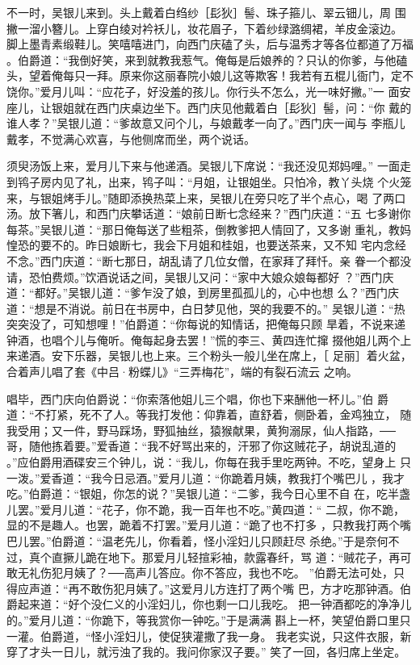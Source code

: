 不一时，吴银儿来到。头上戴着白绉纱［髟狄］髻、珠子箍儿、翠云钿儿，周
围撇一溜小簪儿。上穿白绫对衿袄儿，妆花眉子，下着纱绿潞绸裙，羊皮金滚边。
脚上墨青素缎鞋儿。笑嘻嘻进门，向西门庆磕了头，后与温秀才等各位都道了万福
。伯爵道：“我倒好笑，来到就教我惹气。俺每是后娘养的？只认的你爹，与他磕
头，望着俺每只一拜。原来你这丽春院小娘儿这等欺客！我若有五棍儿衙门，定不
饶你。”爱月儿叫：“应花子，好没羞的孩儿。你行头不怎么，光一味好撇。”一
面安座儿，让银姐就在西门庆桌边坐下。西门庆见他戴着白［髟狄］髻，问：“你
戴的谁人孝？”吴银儿道：“爹故意又问个儿，与娘戴孝一向了。”西门庆一闻与
李瓶儿戴孝，不觉满心欢喜，与他侧席而坐，两个说话。

须臾汤饭上来，爱月儿下来与他递酒。吴银儿下席说：“我还没见郑妈哩。”
一面走到鸨子房内见了礼，出来，鸨子叫：“月姐，让银姐坐。只怕冷，教丫头烧
个火笼来，与银姐烤手儿。”随即添换热菜上来，吴银儿在旁只吃了半个点心，喝
了两口汤。放下箸儿，和西门庆攀话道：“娘前日断七念经来？”西门庆道：“五
七多谢你每茶。”吴银儿道：“那日俺每送了些粗茶，倒教爹把人情回了，又多谢
重礼，教妈惶恐的要不的。昨日娘断七，我会下月姐和桂姐，也要送茶来，又不知
宅内念经不念。”西门庆道：“断七那日，胡乱请了几位女僧，在家拜了拜忏。亲
眷一个都没请，恐怕费烦。”饮酒说话之间，吴银儿又问：“家中大娘众娘每都好
？”西门庆道：“都好。”吴银儿道：“爹乍没了娘，到房里孤孤儿的，心中也想
么？”西门庆道：“想是不消说。前日在书房中，白日梦见他，哭的我要不的。”
吴银儿道：“热突突没了，可知想哩！”伯爵道：“你每说的知情话，把俺每只顾
旱着，不说来递钟酒，也唱个儿与俺听。俺每起身去罢！”慌的李三、黄四连忙撺
掇他姐儿两个上来递酒。安下乐器，吴银儿也上来。三个粉头一般儿坐在席上，［
足丽］着火盆，合着声儿唱了套《中吕·粉蝶儿》“三弄梅花”，端的有裂石流云
之响。

唱毕，西门庆向伯爵说：“你索落他姐儿三个唱，你也下来酬他一杯儿。”伯
爵道：“不打紧，死不了人。等我打发他：仰靠着，直舒着，侧卧着，金鸡独立，
随我受用；又一件，野马踩场，野狐抽丝，猿猴献果，黄狗溺尿，仙人指路，──
哥，随他拣着要。”爱香道：“我不好骂出来的，汗邪了你这贼花子，胡说乱道的
。”应伯爵用酒碟安三个钟儿，说：“我儿，你每在我手里吃两钟。不吃，望身上
只一泼。”爱香道：“我今日忌酒。”爱月儿道：“你跪着月姨，教我打个嘴巴儿
，我才吃。”伯爵道：“银姐，你怎的说？”吴银儿道：“二爹，我今日心里不自
在，吃半盏儿罢。”爱月儿道：“花子，你不跪，我一百年也不吃。”黄四道：“
二叔，你不跪，显的不是趣人。也罢，跪着不打罢。”爱月儿道：“跪了也不打多
，只教我打两个嘴巴儿罢。”伯爵道：“温老先儿，你看着，怪小淫妇儿只顾赶尽
杀绝。”于是奈何不过，真个直撅儿跪在地下。那爱月儿轻揎彩袖，款露春纤，骂
道：“贼花子，再可敢无礼伤犯月姨了？──高声儿答应。你不答应，我也不吃。
”伯爵无法可处，只得应声道：“再不敢伤犯月姨了。”这爱月儿方连打了两个嘴
巴，方才吃那钟酒。伯爵起来道：“好个没仁义的小淫妇儿，你也剩一口儿我吃。
把一钟酒都吃的净净儿的。”爱月儿道：“你跪下，等我赏你一钟吃。”于是满满
斟上一杯，笑望伯爵口里只一灌。伯爵道，“怪小淫妇儿，使促狭灌撒了我一身。
我老实说，只这件衣服，新穿了才头一日儿，就污浊了我的。我问你家汉子要。”
笑了一回，各归席上坐定。


